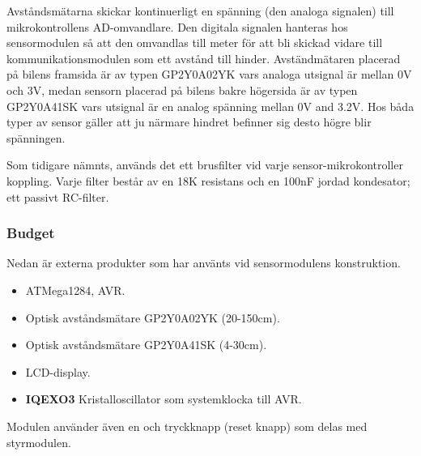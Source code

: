 \documentclass[tekniskrapport/tech.tex]{subfiles}
\begin{document}
Avståndsmätarna skickar kontinuerligt en spänning (den analoga signalen) till
mikrokontrollens AD-omvandlare. Den digitala signalen hanteras hos
sensormodulen så att den omvandlas till meter för att bli skickad vidare till
kommunikationsmodulen som ett avstånd till hinder. Avständmätaren placerad på
bilens framsida är av typen GP2Y0A02YK vars analoga utsignal är mellan 0V och
3V, medan sensorn placerad på bilens bakre högersida är av typen GP2Y0A41SK
vars utsignal är en analog spänning mellan 0V and 3.2V. Hos båda typer av
sensor gäller att ju närmare hindret befinner sig desto högre blir spänningen. 

Som tidigare nämnts, används det ett brusfilter vid varje
sensor-mikrokontroller koppling. Varje filter består av en 18K resistans och en
100nF jordad kondesator; ett passivt RC-filter.

\subsubsection{Budget}
Nedan är externa produkter som har använts vid sensormodulens konstruktion.
\begin{itemize}
	\item \textbf{\modMicrocontroller} ATMega1284, AVR. 
    \item \textbf{\modDistf} Optisk avståndsmätare GP2Y0A02YK (20-150cm).
    \item \textbf{\modDists} Optisk avståndsmätare GP2Y0A41SK (4-30cm).
    \item \textbf{\modLcd} LCD-display.
    \item \textbf{IQEXO3} Kristalloscillator som systemklocka till AVR.
\end{itemize}
Modulen använder även en {\modJtag} och tryckknapp (reset knapp) som delas med
styrmodulen.
\end{document}
